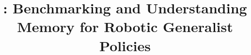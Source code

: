 \documentclass[10pt,letterpaper]{article}
\title{\benchname: Benchmarking and Understanding Memory for Robotic Generalist Policies}
\begin{document}


{
    \small
    
    
}
\end{document}
